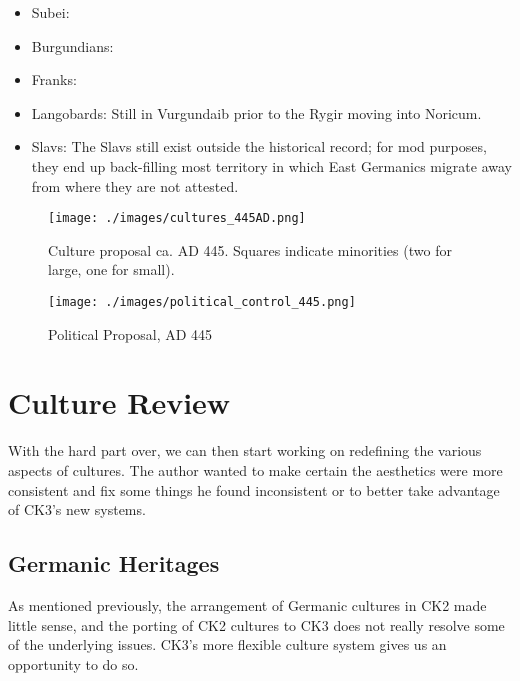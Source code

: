 \documentclass{article}
\begin{document}
\begin{itemize}
		\item Subei:\newline
		
		\item Burgundians:\newline
		
		\item Franks:\newline
		
		\item Langobards:\newline
		Still in Vurgundaib prior to the Rygir moving into Noricum.
		
		\item Slavs:\newline
		The Slavs still exist outside the historical record; for mod purposes, they end up back-filling most territory in which East Germanics migrate away from where they are not attested.
	\end{itemize}
	
	\newpage
	
	\begin{figure}[h!]
		\centering
		\texttt{[image: ./images/cultures\_445AD.png]}
		\caption{Culture proposal ca. AD 445. Squares indicate minorities (two for large, one for small).}
	\end{figure}
	
	\begin{figure}[h!]
		\centering
		\texttt{[image: ./images/political\_control\_445.png]}
		\caption{Political Proposal, AD 445}
	\end{figure}
	
	\newpage
	
	\section{Culture Review}
	\label{sec:culture_review}
	
	With the hard part over, we can then start working on redefining the various aspects of cultures.
	The author wanted to make certain the aesthetics were more consistent and fix some things he found inconsistent or to better take advantage of CK3's new systems.
	
	\subsection{Germanic Heritages}
	\label{sec:culture_review:subsec:germanic_heritages}
	As mentioned previously, the arrangement of Germanic cultures in CK2 made little sense, and the porting of CK2 cultures to CK3 does not really resolve some of the underlying issues.
	CK3's more flexible culture system gives us an opportunity to do so.
	
\end{document}
